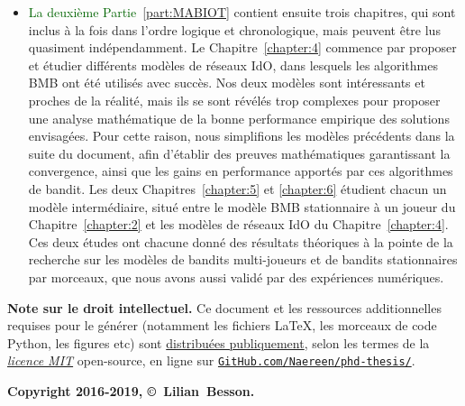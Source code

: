 \begin{resume_fr}
\begin{itemize}
    \item
\textcolor{darkgreen}{La deuxième Partie~\ref{part:MABIOT}} contient ensuite trois chapitres, qui sont inclus à la fois dans l'ordre logique et chronologique, mais peuvent être lus quasiment indépendamment.
Le Chapitre~\ref{chapter:4} commence par proposer et étudier différents modèles de réseaux IdO, dans lesquels les algorithmes BMB ont été utilisés avec succès. Nos deux modèles sont intéressants et proches de la réalité, mais ils se sont révélés trop complexes pour proposer une analyse mathématique de la bonne performance empirique des solutions envisagées.
Pour cette raison, nous simplifions les modèles précédents dans la suite du document,
afin d'établir des preuves mathématiques garantissant la convergence, ainsi que les gains en performance apportés par ces algorithmes de bandit.
Les deux Chapitres~\ref{chapter:5} et \ref{chapter:6} étudient chacun un modèle intermédiaire, situé entre le modèle BMB stationnaire à un joueur du Chapitre~\ref{chapter:2} et les modèles de réseaux IdO du Chapitre~\ref{chapter:4}.
Ces deux études ont chacune donné des résultats théoriques à la pointe de la recherche sur les modèles de bandits multi-joueurs et de bandits stationnaires par morceaux, que nous avons aussi validé par des expériences numériques.

\end{itemize}


\vfill{}

\textbf{Note sur le droit intellectuel.}
%
Ce document et les ressources additionnelles requises pour le générer (notamment les fichiers \LaTeX, les morceaux de code Python, les figures etc)
sont \href{https://github.com/Naereen/phd-thesis/}{distribuées publiquement},
selon les termes de la \href{https://lbesson.mit-license.org/}{\emph{licence MIT}} open-source,
en ligne sur \href{https://github.com/Naereen/phd-thesis/}{\texttt{GitHub.com/Naereen/phd-thesis/}}.


\begin{center}
    \textbf{Copyright 2016-2019, \copyright ~Lilian~Besson.}
\end{center}


\end{resume_fr}
